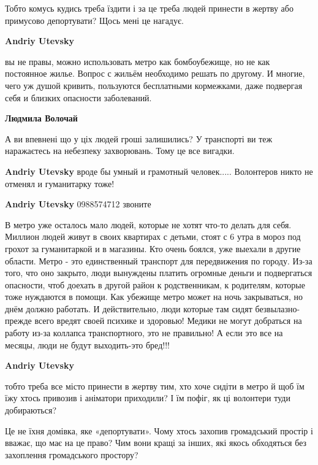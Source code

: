 \begin{itemize}
Тобто комусь кудись треба їздити і за це треба людей принести в жертву або
примусово депортувати? Щось мені це нагадує.

\begin{itemize} %
\textbf{Andriy Utevsky} 

вы не правы, можно использовать метро как бомбоубежище, но не как постоянное
жилье. Вопрос с жильём необходимо решать по другому. И многие, чего уж душой
кривить, пользуются бесплатными кормежками, даже подвергая себя и близких
опасности заболеваний.

\textbf{Людмила Волочай} 

А ви впевнені що у ціх людей гроші залишились? У транспорті ви теж наражаєтесь
на небезпеку захворювань. Тому це все вигадки.

\textbf{Andriy Utevsky} вроде бы умный и грамотный человек..... Волонтеров никто не отменял и гуманитарку тоже!

\textbf{Andriy Utevsky} 0988574712 звоните


В метро уже осталось мало людей, которые не хотят что-то делать для себя.
Миллион людей живут в своих квартирах с детьми, стоят с 6 утра в мороз под
грохот за гуманитаркой и в магазины. Кто очень боялся, уже выехали в другие
области. Метро - это единственный транспорт для передвижения по городу. Из-за
того, что оно закрыто, люди вынуждены платить огромные деньги и подвергаться
опасности, чтоб доехать в другой район к родственникам, к родителям, которые
тоже нуждаются в помощи. Как убежище метро может на ночь закрываться, но днём
должно работать. И действительно, люди которые там сидят безвылазно-прежде
всего вредят своей психике и здоровью! Медики не могут добраться на работу
из-за коллапса транспортного, это не правильно! А если это все на месяцы, люди
не будут выходить-это бред!!!

\textbf{Andriy Utevsky} 

тобто треба все місто принести в жертву тим, хто хоче сидіти в метро й щоб їм
їжу хтось привозив і аніматори приходили? І їм пофіг, як ці волонтери туди
добираються?

Це не їхня домівка, яке «депортувати». Чому хтось захопив громадський простір і
вважає, що має на це право? Чим вони кращі за інших, які якось обходяться без
захоплення громадського простору?

\end{itemize} %


\end{itemize}
